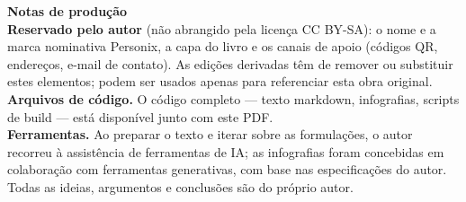 \clearpage
\thispagestyle{empty}
\begin{flushleft}\small\sffamily
\textbf{Notas de produção}\\[1.2em]

\textbf{Reservado pelo autor} (não abrangido pela licença CC BY-SA): o
nome e a marca nominativa Personix, a capa do livro e os canais de apoio
(códigos QR, endereços, e-mail de contato). As edições derivadas têm de
remover ou substituir estes elementos; podem ser usados apenas para
referenciar esta obra original.\\[1.2em]

\textbf{Arquivos de código.} O código completo --- texto markdown, infografias,
scripts de build --- está disponível junto com este PDF.\\[1.2em]

\textbf{Ferramentas.} Ao preparar o texto e iterar sobre as formulações, o
autor recorreu à assistência de ferramentas de IA; as infografias foram
concebidas em colaboração com ferramentas generativas, com base nas
especificações do autor. Todas as ideias, argumentos e conclusões são do
próprio autor.
\end{flushleft}
\clearpage
